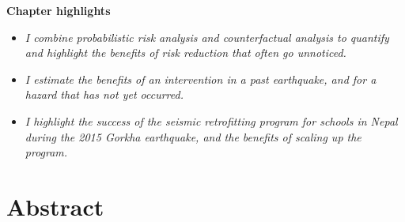 \begin{small}





\clearpage
\vspace*{\fill}
\begingroup
\centering

\textbf{\Large{Chapter highlights}}

\hrulefill 

\begin{itemize}
\item \textsl{I combine probabilistic risk analysis and counterfactual analysis to quantify and highlight the benefits of risk reduction that often go unnoticed.}

\item \textsl{I estimate the benefits of an intervention in a past earthquake, and for a hazard that has not yet occurred.}

\item \textsl{I highlight the success of the seismic retrofitting program for schools in Nepal during the 2015 Gorkha earthquake, and the benefits of scaling up the program.}
\end{itemize}


\endgroup
\vspace*{\fill}



\end{small}
\clearpage



\section{Abstract}

